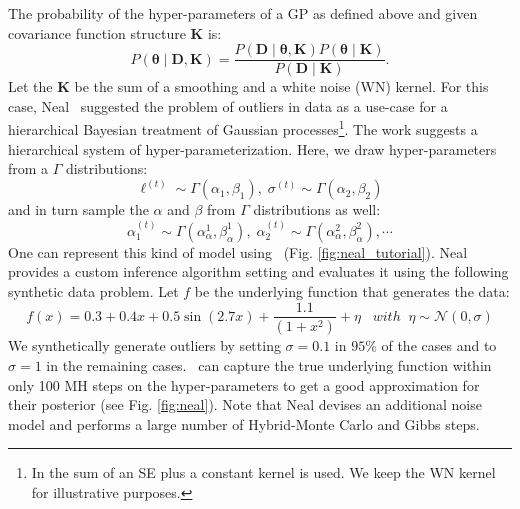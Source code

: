 The probability of the hyper-parameters of a GP as defined above and given covariance function structure $\mathbf{K}$ is:
\begin{equation}
\label{eq:hyperProbability}
P(\bm{\theta} \mid \mathbf{D,K}) = \frac{P(\mathbf{D} \mid \bm{\theta}, \mathbf{K})P(\bm{\theta} \mid  \mathbf{K})}{P(\mathbf{D} \mid \mathbf{K})}.
\end{equation}
Let the $\mathbf{K}$ be the sum of a smoothing and a white noise (WN) kernel. For this case, Neal~\citeyearpar{neal1997monte} suggested the problem of outliers in data as a use-case for a hierarchical Bayesian treatment of Gaussian processes\footnote{In \citep{neal1997monte} the sum of an SE plus a constant kernel is used. We keep the WN kernel for illustrative purposes.}. The work suggests a hierarchical system of hyper-parameterization. Here, we draw hyper-parameters from a $\Gamma$ distributions:
\begin{equation}
\label{eq:hyper-ell}
\ell^{(t)} \sim \Gamma(\alpha_1,\beta_1),\;\sigma^{(t)} \sim \Gamma(\alpha_2,\beta_2)
\end{equation} 
and in turn sample the $\alpha$ and $\beta$ from $\Gamma$ distributions as well:
\begin{equation}
\label{eq:hyper-alpha}
\alpha_1^{(t)} \sim \Gamma(\alpha^1_{\alpha},\beta^1_{ \alpha } ),\; \alpha_2^{(t)} \sim \Gamma(\alpha^2_{\alpha},\beta^2_{\alpha}),\cdots
\end{equation}
One can represent this kind of model using \gpmem\ (Fig. \ref{fig:neal_tutorial}).
Neal provides a custom inference algorithm setting and evaluates it using the following synthetic data problem. Let $f$ be the underlying function that generates the data:
\begin{equation}
f(x) =  0.3 + 0.4 x + 0.5 \sin(2.7x) + \frac{1.1}{(1+ x^2)} + \eta \;\;\; with\;\;\eta \sim \mathcal{N}(0,\sigma)
\end{equation}
We synthetically generate outliers by setting $\sigma = 0.1$ in $95\%$ of the cases and to $\sigma = 1$ in the remaining cases. \gpmem\  can capture the true underlying function within only 100 MH steps on the hyper-parameters to get a good approximation for their posterior (see Fig. \ref{fig:neal}). Note that Neal devises an additional noise model and performs a large number of Hybrid-Monte Carlo and Gibbs steps.  
